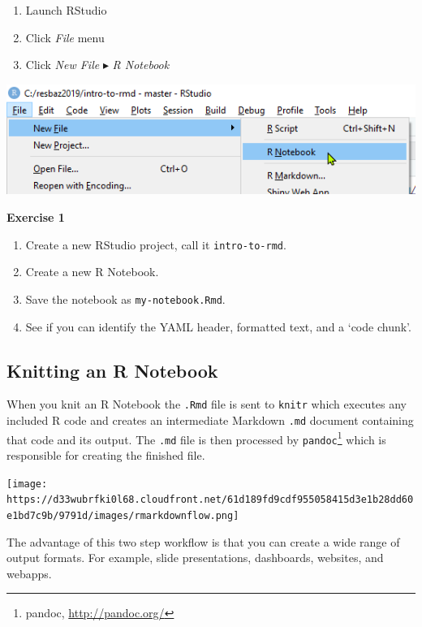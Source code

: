\documentclass[]{article}
\providecommand{\tightlist}{%
  \setlength{\itemsep}{0pt}\setlength{\parskip}{0pt}}
\let\rmarkdownfootnote\footnote%
\def\footnote{\protect\rmarkdownfootnote}
\begin{document}
\begin{enumerate}
\def\labelenumi{\arabic{enumi}.}
\tightlist
\item
  Launch RStudio
\item
  Click \emph{File} menu
\item
  Click \emph{New File} \(\blacktriangleright\) \emph{R Notebook}
\end{enumerate}

\includegraphics{./createnewrnotebook.png}

\textbf{Exercise 1}

\begin{enumerate}
\def\labelenumi{\arabic{enumi}.}
\tightlist
\item
  Create a new RStudio project, call it \texttt{intro-to-rmd}.
\item
  Create a new R Notebook.
\item
  Save the notebook as \texttt{my-notebook.Rmd}.
\item
  See if you can identify the YAML header, formatted text, and a `code
  chunk'.
\end{enumerate}

\hypertarget{knitting-an-r-notebook}{%
\subsection{Knitting an R Notebook}\label{knitting-an-r-notebook}}

When you knit an R Notebook the \texttt{.Rmd} file is sent to
\texttt{knitr} which executes any included R code and creates an
intermediate Markdown \texttt{.md} document containing that code and its
output. The \texttt{.md} file is then processed by
\texttt{pandoc}\footnote{pandoc, \url{http://pandoc.org/}} which is
responsible for creating the finished file.

\texttt{[image: https://d33wubrfki0l68.cloudfront.net/61d189fd9cdf955058415d3e1b28dd60e1bd7c9b/9791d/images/rmarkdownflow.png]}

The advantage of this two step workflow is that you can create a wide
range of output formats. For example, slide presentations, dashboards,
websites, and webapps.
\end{document}
